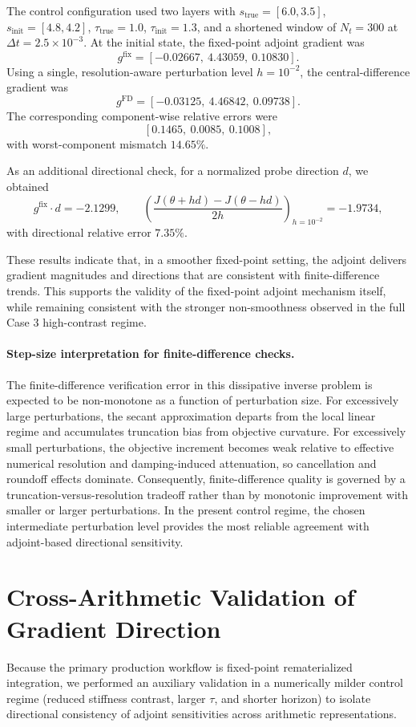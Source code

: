 \documentclass[11pt]{article}
\begin{document}
The control configuration used two layers with \(s_{\text{true}}=[6.0,3.5]\), \(s_{\text{init}}=[4.8,4.2]\), \(\tau_{\text{true}}=1.0\), \(\tau_{\text{init}}=1.3\), and a shortened window of \(N_t=300\) at \(\Delta t=2.5\times10^{-3}\).
At the initial state, the fixed-point adjoint gradient was
\[
g^{\mathrm{fix}}=[-0.02667,\ 4.43059,\ 0.10830].
\]
Using a single, resolution-aware perturbation level \(h=10^{-2}\), the central-difference gradient was
\[
g^{\mathrm{FD}}=[-0.03125,\ 4.46842,\ 0.09738].
\]
The corresponding component-wise relative errors were
\[
[0.1465,\ 0.0085,\ 0.1008],
\]
with worst-component mismatch \(14.65\%\).

As an additional directional check, for a normalized probe direction \(d\), we obtained
\[
g^{\mathrm{fix}}\!\cdot d=-2.1299,\qquad
\left(\frac{J(\theta+h d)-J(\theta-h d)}{2h}\right)_{h=10^{-2}}=-1.9734,
\]
with directional relative error \(7.35\%\).

These results indicate that, in a smoother fixed-point setting, the adjoint delivers gradient magnitudes and directions that are consistent with finite-difference trends.
This supports the validity of the fixed-point adjoint mechanism itself, while remaining consistent with the stronger non-smoothness observed in the full Case 3 high-contrast regime.

\paragraph{Step-size interpretation for finite-difference checks.}
The finite-difference verification error in this dissipative inverse problem is expected to be non-monotone as a function of perturbation size.
For excessively large perturbations, the secant approximation departs from the local linear regime and accumulates truncation bias from objective curvature.
For excessively small perturbations, the objective increment becomes weak relative to effective numerical resolution and damping-induced attenuation, so cancellation and roundoff effects dominate.
Consequently, finite-difference quality is governed by a truncation-versus-resolution tradeoff rather than by monotonic improvement with smaller or larger perturbations.
In the present control regime, the chosen intermediate perturbation level provides the most reliable agreement with adjoint-based directional sensitivity.

\section{Cross-Arithmetic Validation of Gradient Direction}
Because the primary production workflow is fixed-point rematerialized integration, we performed an auxiliary validation in a numerically milder control regime (reduced stiffness contrast, larger \(\tau\), and shorter horizon) to isolate directional consistency of adjoint sensitivities across arithmetic representations.
\end{document}
